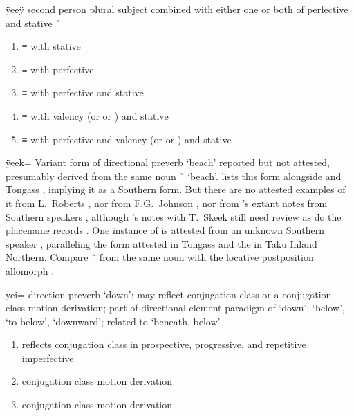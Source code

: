 \begin{morphdesc}[resume*=alphalist]
\item[ÿeeÿ]
	second person plural subject  combined with either one or both of
		perfective 
		and stative  \~\ 
	\begin{enumerate}
	\item	{} ≡ 
		with stative 
	\item	{} ≡ 
		with perfective 
	\item	{} ≡ 
		with perfective 
		and stative 
	\item	{} ≡ 
		with valency 
			(or   or  )
		and stative 
	\item	{} ≡ 
		with perfective 
		and valency 
			(or   or  )
		and stative 
	\end{enumerate}

\item[ÿeeḵ=]\label{m:ÿeeḵ=}
	Variant form of directional preverb  ‘beach’ reported but not attested,
		presumably derived from the same noun  \~\  ‘beach’.
	\citeauthor{leer:1991} lists this form alongside  and Tongass 
		\parencite[133, 297]{leer:1991}, implying it as a Southern form.
	But there are no attested examples of it
		from  L.\ Roberts
			\parencites{velten:1939}{velten:1944},
		nor from  F.G.\ Johnson
			\parencite[138–151]{dauenhauer-dauenhauer:1987},
		nor from \citeauthor{leer:1991}’s extant notes from Southern speakers
			\parencites{leer:1969}{leer:1975g}{leer:1975h},
		although \citeauthor{harrington:1939c}’s notes with T.\ Skeek still need review
			\parencites{harrington:1939c}
		as do the \citeauthor{waterman:1922} placename records
			\parencites{waterman:1922}{thornton:2012}.
	One instance of  is attested from an unknown Southern speaker
		\parencite[17]{leer:1975g},
		paralleling the  form attested in Tongass
		and the  in Taku Inland Northern.
	Compare  \~\  from the same noun with the locative postposition
		allomorph .

\item[yei=]\label{m:yei=}
	direction preverb ‘down’;
	may reflect  conjugation class or a  conjugation class motion derivation;
	part of directional element paradigm of  ‘down’:
		 ‘below’,  ‘to below’,  ‘downward’;
	related to  ‘beneath, below’
	\begin{enumerate}
	\item	reflects  conjugation class in prospective, progressive, and repetitive imperfective
	\item	{} conjugation class motion derivation
	\item	{} conjugation class motion derivation
	\end{enumerate}


\end{morphdesc}
